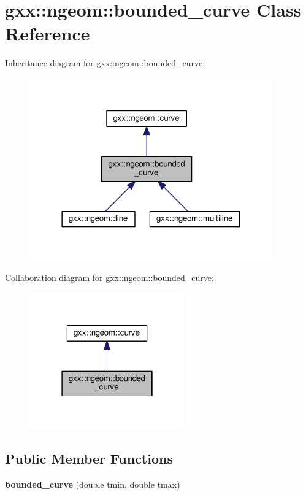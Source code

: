\hypertarget{classgxx_1_1ngeom_1_1bounded__curve}{}\section{gxx\+:\+:ngeom\+:\+:bounded\+\_\+curve Class Reference}
\label{classgxx_1_1ngeom_1_1bounded__curve}


Inheritance diagram for gxx\+:\+:ngeom\+:\+:bounded\+\_\+curve\+:
\nopagebreak
\begin{figure}[H]
\begin{center}
\leavevmode
\includegraphics[width=298pt]{classgxx_1_1ngeom_1_1bounded__curve__inherit__graph}
\end{center}
\end{figure}


Collaboration diagram for gxx\+:\+:ngeom\+:\+:bounded\+\_\+curve\+:
\nopagebreak
\begin{figure}[H]
\begin{center}
\leavevmode
\includegraphics[width=190pt]{classgxx_1_1ngeom_1_1bounded__curve__coll__graph}
\end{center}
\end{figure}
\subsection*{Public Member Functions}
\begin{DoxyCompactItemize}
\item 
{\bfseries bounded\+\_\+curve} (double tmin, double tmax)\hypertarget{classgxx_1_1ngeom_1_1bounded__curve_a84ea6de9c1c738bad9192193b7819861}{}\label{classgxx_1_1ngeom_1_1bounded__curve_a84ea6de9c1c738bad9192193b7819861}

\end{DoxyCompactItemize}
